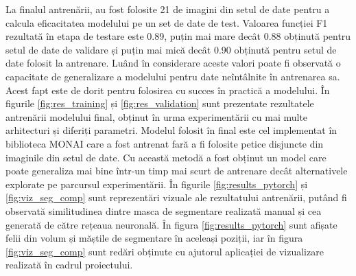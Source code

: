 La finalul antrenării, au fost folosite 21 de imagini din setul de date pentru a calcula eficacitatea modelului pe un set de date de test. Valoarea funcției F1 rezultată în etapa de testare este 0.89, puțin mai mare decât 0.88 obținută pentru setul de date de validare și puțin mai mică decât 0.90 obținută pentru setul de date folosit la antrenare. Luând în considerare aceste valori poate fi observată o capacitate de generalizare a modelului pentru date neîntâlnite în antrenarea sa. Acest fapt este de dorit pentru folosirea cu succes în practică a modelului. În figurile \ref{fig:res_training} și \ref{fig:res_validation} sunt prezentate rezultatele antrenării modelului final, obținut în urma experimentării cu mai multe arhitecturi și diferiți parametri. Modelul folosit în final este cel implementat în biblioteca MONAI care a fost antrenat fară a fi folosite petice disjuncte din imaginile din setul de date. Cu această metodă a fost obținut un model care poate generaliza mai bine într-un timp mai scurt de antrenare decât alternativele explorate pe parcursul experimentării. În figurile \ref{fig:results_pytorch} și \ref{fig:viz_seg_comp} sunt reprezentări vizuale ale rezultatului antrenării, putând fi observată similitudinea dintre masca de segmentare realizată manual și cea generată de către rețeaua neuronală. În figura \ref{fig:results_pytorch} sunt afișate felii din volum și măștile de segmentare în aceleași poziții, iar în figura \ref{fig:viz_seg_comp} sunt redări obținute cu ajutorul aplicației de vizualizare realizată în cadrul proiectului.

